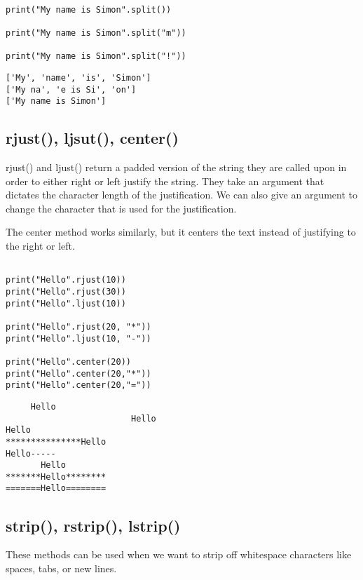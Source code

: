 \documentclass[11pt]{article}
\begin{document}
\begin{verbatim}

print("My name is Simon".split())

print("My name is Simon".split("m"))

print("My name is Simon".split("!"))

\end{verbatim}

\begin{verbatim}
['My', 'name', 'is', 'Simon']
['My na', 'e is Si', 'on']
['My name is Simon']
\end{verbatim}

\subsection{rjust(), ljsut(), center()}
\label{sec:orgd260f4c}

rjust() and ljust() return a padded version of the string they are called upon in order to either right or left justify the string. They take an argument that dictates the character length of the justification. We can also give an argument to change the character that is used for the justification.

The center method works similarly, but it centers the text instead of justifying to the right or left.

\begin{verbatim}

print("Hello".rjust(10))
print("Hello".rjust(30))
print("Hello".ljust(10))

print("Hello".rjust(20, "*"))
print("Hello".ljust(10, "-"))

print("Hello".center(20))
print("Hello".center(20,"*"))
print("Hello".center(20,"="))
\end{verbatim}

\begin{verbatim}
     Hello
                         Hello
Hello     
***************Hello
Hello-----
       Hello        
*******Hello********
=======Hello========
\end{verbatim}

\subsection{strip(), rstrip(), lstrip()}
\label{sec:org3271968}

These methods can be used when we want to strip off whitespace characters like spaces, tabs, or new lines.
\end{document}
